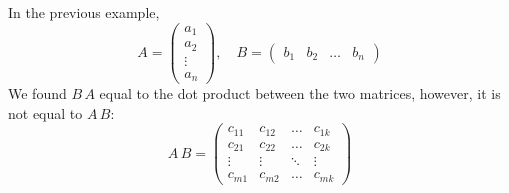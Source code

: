 \documentclass[diffeq.tex]{subfiles}
\begin{document}
    \begin{example}
        In the previous example,
        \begin{equation}
            A = \begin{pmatrix}
                a_{1}\\
                a_{2}\\
                \vdots\\
                a_{n}
            \end{pmatrix},\quad
            B = \begin{pmatrix}
                b_{1} & b_{2} & \dots & b_{n}
            \end{pmatrix}
        \end{equation}
        We found $B\, A$ equal to the dot product between the two matrices, however, it is not equal to $A\, B$:
        \begin{equation}
            A\, B = \begin{pmatrix}
                c_{11} & c_{12} & \dots & c_{1k}\\
                c_{21} & c_{22} & \dots & c_{2k}\\
                \vdots & \vdots & \ddots & \vdots\\
                c_{m1} & c_{m2} & \dots & c_{mk}
            \end{pmatrix}
        \end{equation}
    \end{example}
\end{document}
